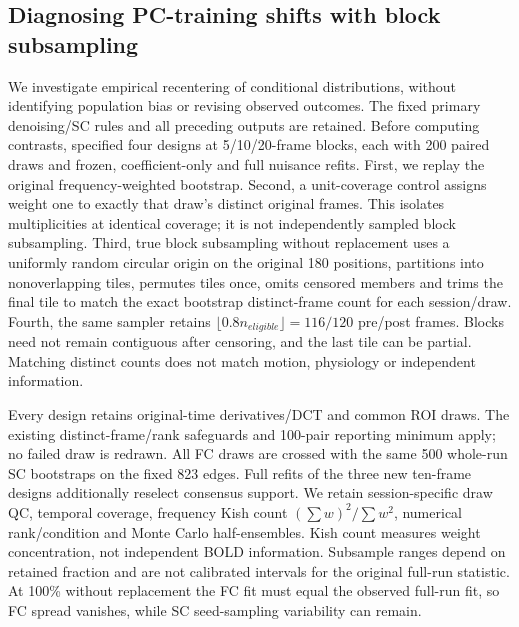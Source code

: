 \documentclass[11pt,a4paper]{article}
\begin{document}
\subsection{Diagnosing PC-training shifts with block subsampling}\label{sec:pcsamplingmethods}
We investigate empirical recentering of conditional distributions, without identifying population bias or revising observed outcomes. The fixed primary denoising/SC rules and all preceding outputs are retained. Before computing contrasts,  specified four designs at 5/10/20-frame blocks, each with 200 paired draws and frozen, coefficient-only and full nuisance refits. First, we replay the original frequency-weighted bootstrap. Second, a unit-coverage control assigns weight one to exactly that draw's distinct original frames. This isolates multiplicities at identical coverage; it is not independently sampled block subsampling. Third, true block subsampling without replacement uses a uniformly random circular origin on the original 180 positions, partitions into nonoverlapping tiles, permutes tiles once, omits censored members and trims the final tile to match the exact bootstrap distinct-frame count for each session/draw. Fourth, the same sampler retains $\lfloor0.8n_{eligible}\rfloor=116/120$ pre/post frames. Blocks need not remain contiguous after censoring, and the last tile can be partial. Matching distinct counts does not match motion, physiology or independent information.

Every design retains original-time derivatives/DCT and common ROI draws. The existing distinct-frame/rank safeguards and 100-pair reporting minimum apply; no failed draw is redrawn. All FC draws are crossed with the same 500 whole-run SC bootstraps on the fixed 823 edges. Full refits of the three new ten-frame designs additionally reselect consensus support. We retain session-specific draw QC, temporal coverage, frequency Kish count $(\sum w)^2/\sum w^2$, numerical rank/condition and Monte Carlo half-ensembles. Kish count measures weight concentration, not independent BOLD information. Subsample ranges depend on retained fraction and are not calibrated intervals for the original full-run statistic. At 100\% without replacement the FC fit must equal the observed full-run fit, so FC spread vanishes, while SC seed-sampling variability can remain.
\end{document}
